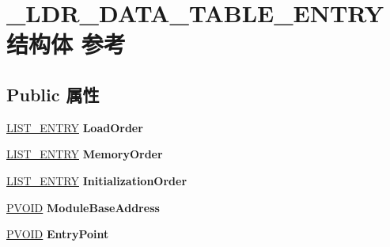 \hypertarget{struct___l_d_r___d_a_t_a___t_a_b_l_e___e_n_t_r_y}{}\section{\+\_\+\+L\+D\+R\+\_\+\+D\+A\+T\+A\+\_\+\+T\+A\+B\+L\+E\+\_\+\+E\+N\+T\+R\+Y结构体 参考}
\label{struct___l_d_r___d_a_t_a___t_a_b_l_e___e_n_t_r_y}
\subsection*{Public 属性}
\begin{DoxyCompactItemize}
\item 
\mbox{\label{struct___l_d_r___d_a_t_a___t_a_b_l_e___e_n_t_r_y_af3c8b5d51dacb300f1eb4caada3f71fe}} 
\hyperlink{struct___l_i_s_t___e_n_t_r_y}{L\+I\+S\+T\+\_\+\+E\+N\+T\+RY} {\bfseries Load\+Order}
\item 
\mbox{\label{struct___l_d_r___d_a_t_a___t_a_b_l_e___e_n_t_r_y_a0191cf303bdc106a6361d36acfbc129a}} 
\hyperlink{struct___l_i_s_t___e_n_t_r_y}{L\+I\+S\+T\+\_\+\+E\+N\+T\+RY} {\bfseries Memory\+Order}
\item 
\mbox{\label{struct___l_d_r___d_a_t_a___t_a_b_l_e___e_n_t_r_y_af85095780099dc8bbf9d85c982048c5f}} 
\hyperlink{struct___l_i_s_t___e_n_t_r_y}{L\+I\+S\+T\+\_\+\+E\+N\+T\+RY} {\bfseries Initialization\+Order}
\item 
\mbox{\label{struct___l_d_r___d_a_t_a___t_a_b_l_e___e_n_t_r_y_ac676206afd6dbff2209606466466110f}} 
\hyperlink{interfacevoid}{P\+V\+O\+ID} {\bfseries Module\+Base\+Address}
\item 
\mbox{\label{struct___l_d_r___d_a_t_a___t_a_b_l_e___e_n_t_r_y_a2cc90b4cfbc5000933977c0e725e9b8d}} 
\hyperlink{interfacevoid}{P\+V\+O\+ID} {\bfseries Entry\+Point}
\item 
\mbox{\label{struct___l_d_r___d_a_t_a___t_a_b_l_e___e_n_t_r_y_ae9aa63d68e07c1239be42119ac4cab36}} 

\end{DoxyCompactItemize}
